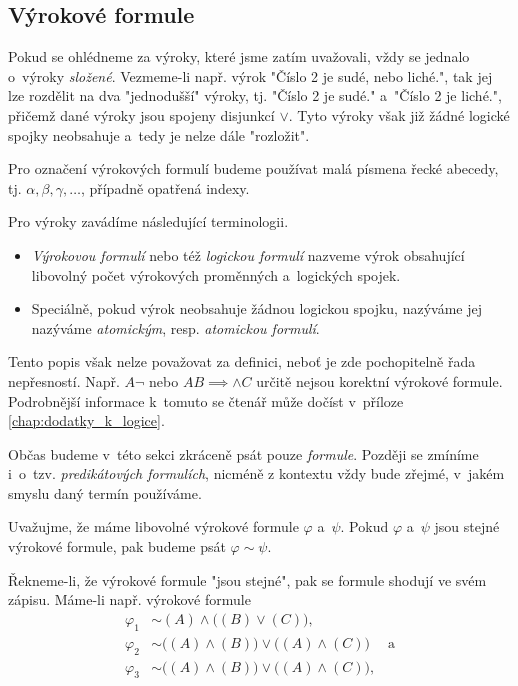 \subsection{Výrokové formule}
Pokud se ohlédneme za výroky, které jsme zatím uvažovali, vždy se jednalo o~výroky \emph{složené}. Vezmeme-li např. výrok "Číslo 2 je sudé, nebo liché.", tak jej lze rozdělit na dva "jednodušší" výroky, tj. "Číslo 2 je sudé." a~"Číslo 2 je liché.", přičemž dané výroky jsou spojeny disjunkcí $\lor$. Tyto výroky však již žádné logické spojky neobsahuje a~tedy je nelze dále "rozložit".
\begin{convention}
    Pro označení výrokových formulí budeme používat malá písmena řecké abecedy, tj. $\alpha,\beta,\gamma,\dots$, případně opatřená indexy.
\end{convention}
Pro výroky zavádíme následující terminologii.
\begin{itemize}
    \item \emph{Výrokovou formulí} nebo též \emph{logickou formulí} nazveme výrok obsahující libovolný počet výrokových proměnných a~logických spojek.
    \item Speciálně, pokud výrok neobsahuje žádnou logickou spojku, nazýváme jej nazýváme \emph{atomickým}, resp. \emph{atomickou formulí}.
\end{itemize}
Tento popis však nelze považovat za definici, neboť je zde pochopitelně řada nepřesností. Např. $A\neg$ nebo $AB\implies\land C$ určitě nejsou korektní výrokové formule. Podrobnější informace k~tomuto se čtenář může dočíst v~příloze \ref{chap:dodatky_k_logice}.
\begin{remark}
    Občas budeme v~této sekci zkráceně psát pouze \emph{formule}. Později se zmíníme i~o~tzv. \emph{predikátových formulích}, nicméně z kontextu vždy bude zřejmé, v~jakém smyslu daný termín používáme.
\end{remark}
\begin{convention}
    \label{conv:rovnost_logickych_formuli}
    Uvažujme, že máme libovolné výrokové formule $\varphi$ a~$\psi$. Pokud $\varphi$ a~$\psi$ jsou stejné výrokové formule, pak budeme psát $\varphi\sim\psi$.
\end{convention}
Řekneme-li, že výrokové formule "jsou stejné", pak se formule shodují ve svém zápisu. Máme-li např. výrokové formule
\begin{align*}
    \varphi_1&\sim (A) \land \bigl((B) \lor (C)\bigr),\\
    \varphi_2&\sim \bigl((A) \land (B)\bigr) \lor \bigl((A) \land (C)\bigr)\;\quad\text{a}\\
    \varphi_3&\sim \bigl((A) \land (B)\bigr) \lor \bigl((A) \land (C)\bigr),
\end{align*}
